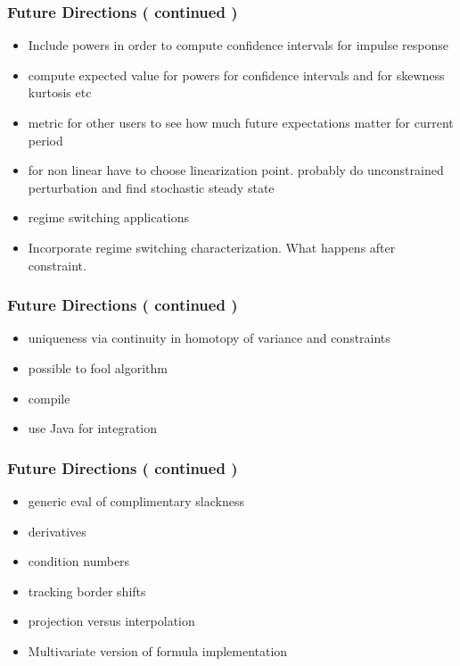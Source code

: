 \documentclass{beamer}
\begin{document}
   \begin{frame}
     \frametitle{Future Directions ( continued )}
     \begin{itemize}
\item Include  powers in order to compute confidence intervals for impulse response
\item compute expected value for powers for confidence intervals and for skewness kurtosis etc
\item metric for other users to see how much future expectations matter for current period
  \item for non linear have to choose linearization point.  probably do unconstrained perturbation and find stochastic steady state
\item regime switching applications
     \item Incorporate regime switching characterization.  What happens after constraint.
     \end{itemize}
   \end{frame}
  \begin{frame}
    \frametitle{Future Directions ( continued )}
    \begin{itemize}
\item uniqueness via continuity in homotopy of variance and constraints
\item possible to fool algorithm
\item compile
\item  use Java for integration
    \end{itemize}
  \end{frame}
  \begin{frame}
    \frametitle{Future Directions ( continued )}
    \begin{itemize}
\item generic eval of complimentary slackness
\item derivatives
\item condition numbers
\item tracking border shifts
\item projection versus interpolation
\item Multivariate version of formula implementation
    \end{itemize}
  \end{frame}
\end{document}
